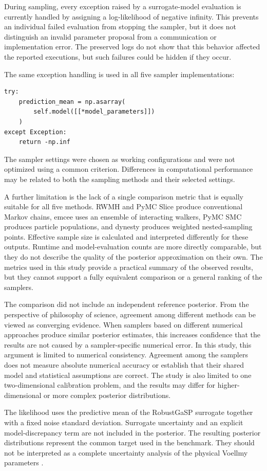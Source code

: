 During sampling, every exception raised by a surrogate-model evaluation is currently handled by assigning a log-likelihood of negative infinity. This prevents an individual failed evaluation from stopping the sampler, but it does not distinguish an invalid parameter proposal from a communication or implementation error. The preserved logs do not show that this behavior affected the reported executions, but such failures could be hidden if they occur.

The same exception handling is used in all five sampler implementations:

\begin{verbatim}
try:
    prediction_mean = np.asarray(
        self.model([[*model_parameters]])
    )
except Exception:
    return -np.inf
\end{verbatim}

The sampler settings were chosen as working configurations and were not optimized using a common criterion. Differences in computational performance may be related to both the sampling methods and their selected settings.

A further limitation is the lack of a single comparison metric that is equally suitable for all five methods. RWMH and PyMC Slice produce conventional Markov chains, emcee uses an ensemble of interacting walkers, PyMC SMC produces particle populations, and dynesty produces weighted nested-sampling points. Effective sample size is calculated and interpreted differently for these outputs. Runtime and model-evaluation counts are more directly comparable, but they do not describe the quality of the posterior approximation on their own. The metrics used in this study provide a practical summary of the observed results, but they cannot support a fully equivalent comparison or a general ranking of the samplers.

The comparison did not include an independent reference posterior. From the perspective of philosophy of science, agreement among different methods can be viewed as converging evidence. When samplers based on different numerical approaches produce similar posterior estimates, this increases confidence that the results are not caused by a sampler-specific numerical error. In this study, this argument is limited to numerical consistency. Agreement among the samplers does not measure absolute numerical accuracy or establish that their shared model and statistical assumptions are correct. The study is also limited to one two-dimensional calibration problem, and the results may differ for higher-dimensional or more complex posterior distributions.

The likelihood uses the predictive mean of the RobustGaSP surrogate together with a fixed noise standard deviation. Surrogate uncertainty and an explicit model-discrepancy term are not included in the posterior. The resulting posterior distributions represent the common target used in the benchmark. They should not be interpreted as a complete uncertainty analysis of the physical Voellmy parameters \autocite{Brynjarsdottir2014,Yildiz2023}.
